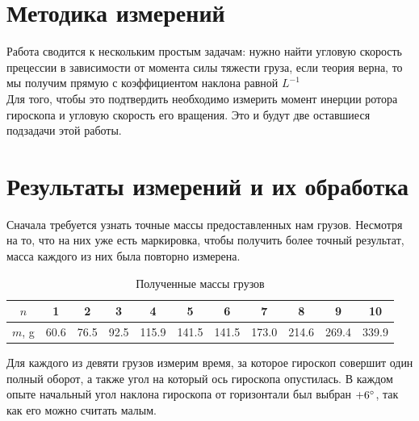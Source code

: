 \documentclass[a4paper,12pt]{article}
\begin{document}
	\section{Методика измерений}
	
	Работа сводится к нескольким простым задачам:
	нужно найти угловую скорость прецессии в зависимости от момента силы тяжести груза, если теория верна, то мы получим прямую с коэффициентом наклона равной $L^{-1}$\\
	
	Для того, чтобы это подтвердить необходимо измерить момент инерции ротора гироскопа и угловую скорость его вращения. Это и будут две оставшиеся подзадачи этой работы.
	
	
	\section{Результаты измерений и их обработка}
	
	Сначала требуется узнать точные массы предоставленных нам грузов. Несмотря на то, что на них уже есть маркировка, чтобы получить более точный результат, масса каждого из них была повторно измерена.
	
	\begin{table}[H]
		\centering
		\small
		\begin{tabular}{|c|c|c|c|c|c|c|c|c|c|c|}
			\hline
			$n$ & 1 & 2 & 3 & 4 & 5 & 6 & 7 & 8 & 9 & 10 \\
			\hline
			$m$, g & 60.6 & 76.5 & 92.5 & 115.9 & 141.5 & 141.5 & 173.0 & 214.6 & 269.4 & 339.9 \\
			\hline
		\end{tabular}
		\caption{Полученные массы грузов}
	\end{table}
	
	Для каждого из девяти грузов измерим время, за которое гироскоп совершит один полный оборот, а также угол на который ось гироскопа опустилась. В каждом опыте начальный угол наклона гироскопа от горизонтали был выбран $+6\degree$, так как его можно считать малым.
	
\end{document}
